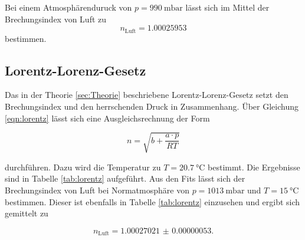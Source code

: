 Bei einem Atmosphärenduruck von $p = \SI{990}{\milli\bar}$ lässt sich im Mittel der Brechungsindex von Luft zu 
\begin{equation*}
    n_\text{Luft} = \num{1.00025953}
\end{equation*}
bestimmen.


%
%
%
%


\subsection{Lorentz-Lorenz-Gesetz}

Das in der Theorie \ref{sec:Theorie} beschriebene Lorentz-Lorenz-Gesetz setzt den Brechungsindex und den herrschenden Druck in Zusammenhang.
Über Gleichung \eqref{eqn:lorentz} lässt sich eine Ausgleichsrechnung der Form


\begin{equation}
    n = \sqrt{b + \frac{a\cdot p}{RT}}
\end{equation}

durchführen.
Dazu wird die Temperatur zu $T = \SI{20.7}{\celsius}$ bestimmt. 
Die Ergebnisse sind in Tabelle \ref{tab:lorentz} aufgeführt.
Aus den Fits lässt sich der Brechungsindex von Luft bei Normatmosphäre von $p=\SI{1013}{\milli\bar}$ und $T=\SI{15}{\celsius}$ bestimmen. 
Dieser ist ebenfalls in Tabelle \ref{tab:lorentz} einzusehen und ergibt sich gemittelt zu

\begin{equation}
    n_\text{Luft} = \num{1.00027021(000000053)}.
\end{equation}

